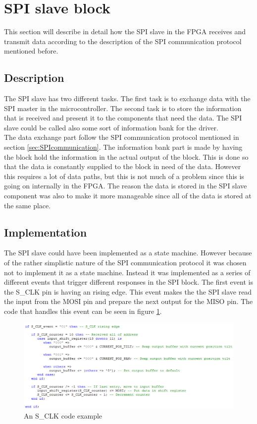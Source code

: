 \section{SPI slave block}
\label{sec:SPIslaveblock}
This section will describe in detail how the SPI slave in the FPGA receives and transmit data according to the description of the SPI communication protocol mentioned before.

\subsection{Description}

The SPI slave has two different tasks. The first task is to exchange data with the SPI master in the microcontroller. The second task is to store the information that is received and present it to the components that need the data. The SPI slave could be called also some sort of information bank for the driver.\\
The data exchange part follow the SPI communication protocol mentioned in section \ref{sec:SPIcommunication}.
The information bank part is made by having the block hold the information in the actual output of the block. This is done so that the data is constantly supplied to the block in need of the data. However this requires a lot of data paths, but this is not much of a problem since this is going on internally in the FPGA. The reason the data is stored in the SPI slave component was also to make it more manageable since all of the data is stored at the same place.

\subsection{Implementation}
\label{sec:Implementation}
The SPI slave could have been implemented as a state machine. However because of  the rather simplistic nature of the SPI communication protocol it was chosen not to implement it as a state machine. Instead it was implemented as a series of different events that trigger different responses in the SPI block. The first event is the S\_CLK pin is having an rising edge. This event makes the the SPI slave read the input from the MOSI pin and prepare the next output for the MISO pin. The code that handles this event can be seen in figure \ref{fig:S_CLK_code_example}. 

\begin{figure}[h!]
\centering
\includegraphics[scale=0.5]{Billeder/FPGA/SPI_Slave/S_CLK_code_example.png}
\caption{ An S\_CLK code example }
\label{fig:S_CLK_code_example}
\end{figure}

